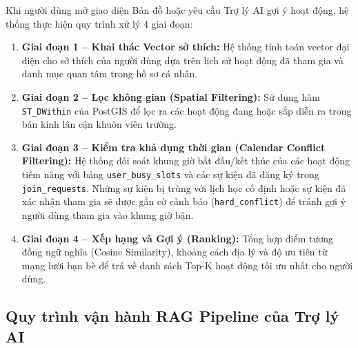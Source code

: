 Khi người dùng mở giao diện Bản đồ hoặc yêu cầu Trợ lý AI gợi ý hoạt động, hệ thống thực hiện quy trình xử lý 4 giai đoạn:
\begin{enumerate}
    \item \textbf{Giai đoạn 1 -- Khai thác Vector sở thích:} Hệ thống tính toán vector đại diện cho sở thích của người dùng dựa trên lịch sử hoạt động đã tham gia và danh mục quan tâm trong hồ sơ cá nhân.
    
    \item \textbf{Giai đoạn 2 -- Lọc không gian (Spatial Filtering):} Sử dụng hàm \texttt{ST\_DWithin} của PostGIS để lọc ra các hoạt động đang hoặc sắp diễn ra trong bán kính lân cận khuôn viên trường.

    \item \textbf{Giai đoạn 3 -- Kiểm tra khả dụng thời gian (Calendar Conflict Filtering):} Hệ thống đối soát khung giờ bắt đầu/kết thúc của các hoạt động tiềm năng với bảng \texttt{user\_busy\_slots} và các sự kiện đã đăng ký trong \texttt{join\_requests}. Những sự kiện bị trùng với lịch học cố định hoặc sự kiện đã xác nhận tham gia sẽ được gắn cờ cảnh báo (\texttt{hard\_conflict}) để tránh gợi ý người dùng tham gia vào khung giờ bận.

    \item \textbf{Giai đoạn 4 -- Xếp hạng và Gợi ý (Ranking):} Tổng hợp điểm tương đồng ngữ nghĩa (Cosine Similarity), khoảng cách địa lý và độ ưu tiên từ mạng lưới bạn bè để trả về danh sách Top-K hoạt động tối ưu nhất cho người dùng.
\end{enumerate}

\subsection{Quy trình vận hành RAG Pipeline của Trợ lý AI}

